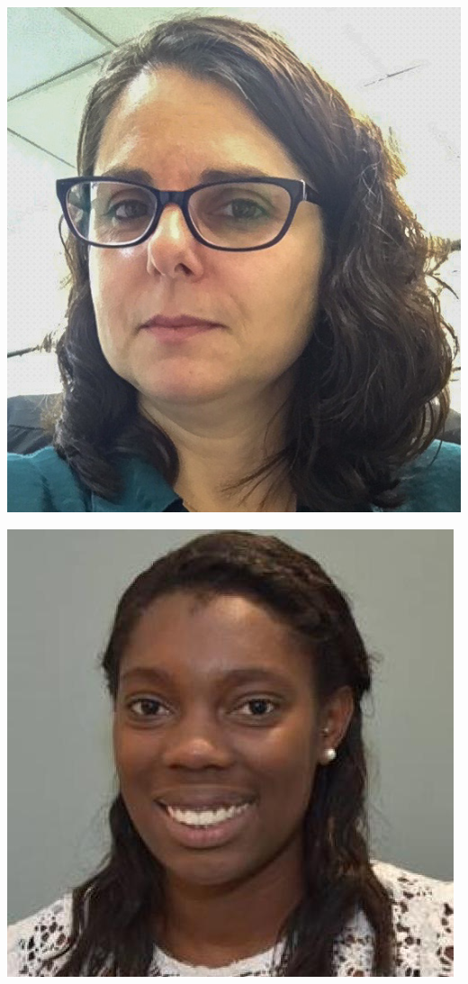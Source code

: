 \documentclass{beamer}
\begin{document}
\begin{frame}


\begin{center}
	\begin{minipage}{0.24\linewidth}
		\includegraphics[width=\linewidth,height=\linewidth]{Figures/Andrea.jpg}
	\end{minipage}%
	\hfill
	\begin{minipage}{0.24\linewidth}
		\includegraphics[width=\linewidth,height=\linewidth]{Figures/Amarise-little.jpg}

\end{minipage}
\end{center}
\end{frame}
\end{document}
